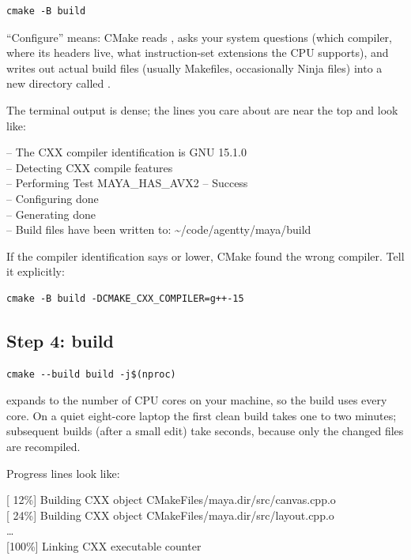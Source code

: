 \begin{lstlisting}[style=shell]
cmake -B build
\end{lstlisting}

``Configure'' means: CMake reads , asks your
system questions (which compiler, where its headers live, what
instruction-set extensions the CPU supports), and writes out actual
build files (usually Makefiles, occasionally Ninja files) into a
new directory called .

The terminal output is dense; the lines you care about are near the
top and look like:

\begin{terminalbox}
-- The CXX compiler identification is GNU 15.1.0\\
-- Detecting CXX compile features\\
-- Performing Test MAYA\_HAS\_AVX2 -- Success\\
-- Configuring done\\
-- Generating done\\
-- Build files have been written to: \textasciitilde/code/agentty/maya/build
\end{terminalbox}

If the compiler identification says  or lower, CMake
found the wrong compiler. Tell it explicitly:

\begin{lstlisting}[style=shell]
cmake -B build -DCMAKE_CXX_COMPILER=g++-15
\end{lstlisting}

\subsection{Step 4: build}

\begin{lstlisting}[style=shell]
cmake --build build -j$(nproc)
\end{lstlisting}

 expands to the number of CPU cores on your machine,
so the build uses every core. On a quiet eight-core laptop the
first clean build takes one to two minutes; subsequent builds
(after a small edit) take seconds, because only the changed files
are recompiled.

Progress lines look like:

\begin{terminalbox}
{[ 12\%] Building CXX object CMakeFiles/maya.dir/src/canvas.cpp.o}\\
{[ 24\%] Building CXX object CMakeFiles/maya.dir/src/layout.cpp.o}\\
\dots\\
{[100\%] Linking CXX executable counter}
\end{terminalbox}

